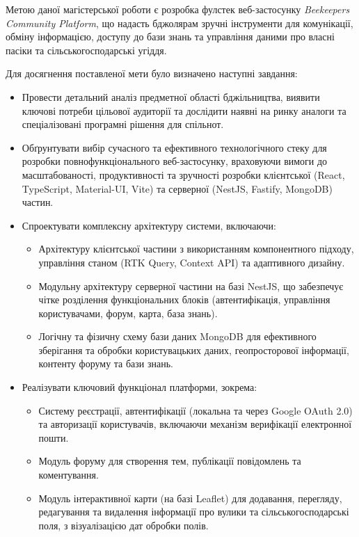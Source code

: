 Метою даної магістерської роботи є розробка фулстек веб-застосунку \textit{Beekeepers Community Platform}, що надасть бджолярам зручні інструменти для комунікації, обміну інформацією, доступу до бази знань та управління даними про власні пасіки та сільськогосподарські угіддя.

Для досягнення поставленої мети було визначено наступні завдання:
\begin{itemize}
    \item Провести детальний аналіз предметної області бджільництва, виявити ключові потреби цільової аудиторії та дослідити наявні на ринку аналоги та спеціалізовані програмні рішення для спільнот.
    \item Обґрунтувати вибір сучасного та ефективного технологічного стеку для розробки повнофункціонального веб-застосунку, враховуючи вимоги до масштабованості, продуктивності та зручності розробки клієнтської (React, TypeScript, Material-UI, Vite) та серверної (NestJS, Fastify, MongoDB) частин.
    \item Спроектувати комплексну архітектуру системи, включаючи:
        \begin{itemize}
            \item Архітектуру клієнтської частини з використанням компонентного підходу, управління станом (RTK Query, Context API) та адаптивного дизайну.
            \item Модульну архітектуру серверної частини на базі NestJS, що забезпечує чітке розділення функціональних блоків (автентифікація, управління користувачами, форум, карта, база знань).
            \item Логічну та фізичну схему бази даних MongoDB для ефективного зберігання та обробки користувацьких даних, геопросторової інформації, контенту форуму та бази знань.
        \end{itemize}
    \item Реалізувати ключовий функціонал платформи, зокрема:
        \begin{itemize}
            \item Систему реєстрації, автентифікації (локальна та через Google OAuth 2.0) та авторизації користувачів, включаючи механізм верифікації електронної пошти.
            \item Модуль форуму для створення тем, публікації повідомлень та коментування.
            \item Модуль інтерактивної карти (на базі Leaflet) для додавання, перегляду, редагування та видалення інформації про вулики та сільськогосподарські поля, з візуалізацією дат обробки полів.

\end{itemize}
\end{itemize}
